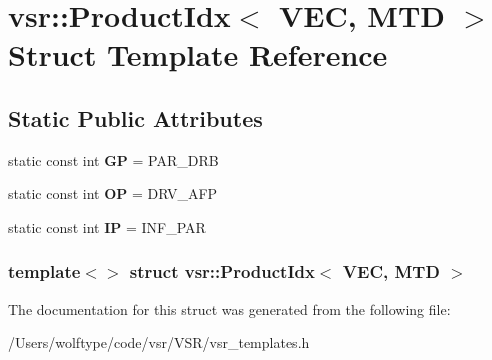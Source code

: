 \hypertarget{structvsr_1_1_product_idx_3_01_v_e_c_00_01_m_t_d_01_4}{\section{vsr\-:\-:Product\-Idx$<$ V\-E\-C, M\-T\-D $>$ Struct Template Reference}
\label{structvsr_1_1_product_idx_3_01_v_e_c_00_01_m_t_d_01_4}
}
\subsection*{Static Public Attributes}
\begin{DoxyCompactItemize}
\item 
\hypertarget{structvsr_1_1_product_idx_3_01_v_e_c_00_01_m_t_d_01_4_a4d0dcc57c4f19e9305159187b6dc6fc9}{static const int {\bfseries G\-P} = P\-A\-R\-\_\-\-D\-R\-B}\label{structvsr_1_1_product_idx_3_01_v_e_c_00_01_m_t_d_01_4_a4d0dcc57c4f19e9305159187b6dc6fc9}

\item 
\hypertarget{structvsr_1_1_product_idx_3_01_v_e_c_00_01_m_t_d_01_4_abdfe0a6107268c191a78d03811f172da}{static const int {\bfseries O\-P} = D\-R\-V\-\_\-\-A\-F\-P}\label{structvsr_1_1_product_idx_3_01_v_e_c_00_01_m_t_d_01_4_abdfe0a6107268c191a78d03811f172da}

\item 
\hypertarget{structvsr_1_1_product_idx_3_01_v_e_c_00_01_m_t_d_01_4_a8f16d605ee1dbb2a9becff5b6e7c746e}{static const int {\bfseries I\-P} = I\-N\-F\-\_\-\-P\-A\-R}\label{structvsr_1_1_product_idx_3_01_v_e_c_00_01_m_t_d_01_4_a8f16d605ee1dbb2a9becff5b6e7c746e}

\end{DoxyCompactItemize}
\subsubsection*{template$<$$>$ struct vsr\-::\-Product\-Idx$<$ V\-E\-C, M\-T\-D $>$}



The documentation for this struct was generated from the following file\-:\begin{DoxyCompactItemize}
\item 
/\-Users/wolftype/code/vsr/\-V\-S\-R/vsr\-\_\-templates.\-h\end{DoxyCompactItemize}

